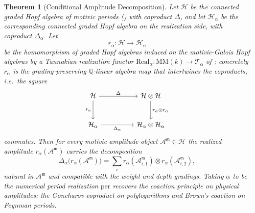 \documentclass[12pt]{article}
\newtheorem{theorem}{Theorem}[section]
\theoremstyle{definition}
\theoremstyle{remark}
\newcommand{\Real}{\mathrm{Real}}
\newcommand{\per}{\mathrm{per}}
\newcommand{\Amm}{\mathcal{A}^{\mathfrak{m}}}
\newcommand{\coA}{\Delta}
\newcommand{\Zmot}{\mathcal{H}}
\newcommand{\Qbb}{\mathbb{Q}}
\begin{document}
\begin{theorem}[Conditional Amplitude Decomposition]
\label{thm:cad}
Let $\Zmot$ be the connected graded Hopf algebra of motivic periods
\textup{()} with coproduct $\coA$, and let $\Zmot_\alpha$ be the
corresponding connected graded Hopf algebra on the realization side, with coproduct
$\coA_\alpha$. Let
\[
r_\alpha\colon \Zmot\longrightarrow \Zmot_\alpha
\]
be the homomorphism of graded Hopf algebras induced on the motivic-Galois Hopf algebras by a
Tannakian realization functor $\Real_\alpha\colon \mathrm{MM}(k)\to\mathcal{T}_\alpha$ of
; concretely $r_\alpha$ is the grading-preserving $\Qbb$-linear algebra
map that intertwines the coproducts, i.e.\ the square
\begin{equation}
\label{eq:compat}
\begin{tikzcd}[column sep=huge, row sep=large]
\Zmot \arrow[r, "\coA"] \arrow[d, "r_\alpha"'] &
\Zmot\otimes\Zmot \arrow[d, "r_\alpha\otimes r_\alpha"] \\
\Zmot_\alpha \arrow[r, "\coA_\alpha"'] &
\Zmot_\alpha\otimes\Zmot_\alpha
\end{tikzcd}
\end{equation}
commutes. Then for every motivic amplitude object $\Amm\in\Zmot$ the realized amplitude
$r_\alpha(\Amm)$ carries the decomposition
\[
\coA_\alpha\big(r_\alpha(\Amm)\big)=\sum_i r_\alpha(\Amm_{i,1})\otimes r_\alpha(\Amm_{i,2}),
\]
natural in $\Amm$ and compatible with the weight and depth gradings. Taking $\alpha$ to be
the numerical period realization $\per$ recovers the coaction principle on physical
amplitudes: the Goncharov coproduct on polylogarithms and Brown's coaction on Feynman periods.
\end{theorem}
\end{document}
